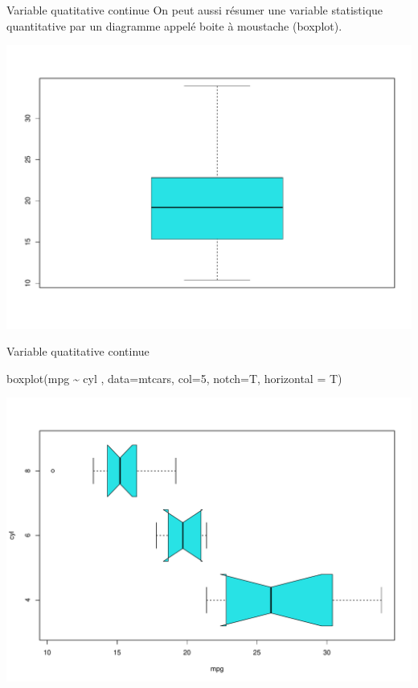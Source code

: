 \documentclass[
  8pt,
  ignorenonframetext,
]{beamer}
\newenvironment{Shaded}{\begin{snugshade}}{\end{snugshade}}
\newcommand{\AttributeTok}[1]{\textcolor[rgb]{0.77,0.63,0.00}{#1}}
\newcommand{\DecValTok}[1]{\textcolor[rgb]{0.00,0.00,0.81}{#1}}
\newcommand{\FunctionTok}[1]{\textcolor[rgb]{0.00,0.00,0.00}{#1}}
\newcommand{\NormalTok}[1]{#1}
\newcommand{\SpecialCharTok}[1]{\textcolor[rgb]{0.00,0.00,0.00}{#1}}
\begin{document}
\begin{frame}[fragile]{Variable quatitative continue}
\protect\hypertarget{variable-quatitative-continue-1}{}
On peut aussi résumer une variable statistique quantitative par un
diagramme appelé boite à moustache (boxplot).

\begin{Shaded}
\end{Shaded}

\begin{center}\includegraphics[width=0.8\linewidth]{Chap2_R_files/figure-beamer/unnamed-chunk-22-1} \end{center}
\end{frame}

\begin{frame}[fragile]{Variable quatitative continue}
\protect\hypertarget{variable-quatitative-continue-2}{}
\begin{Shaded}
\begin{Highlighting}[]
\FunctionTok{boxplot}\NormalTok{(mpg }\SpecialCharTok{\textasciitilde{}}\NormalTok{ cyl , }\AttributeTok{data=}\NormalTok{mtcars, }\AttributeTok{col=}\DecValTok{5}\NormalTok{, }\AttributeTok{notch=}\NormalTok{T, }\AttributeTok{horizontal =}\NormalTok{ T)}
\end{Highlighting}
\end{Shaded}

\begin{center}\includegraphics[width=0.8\linewidth]{Chap2_R_files/figure-beamer/unnamed-chunk-23-1} \end{center}
\end{frame}
\end{document}
